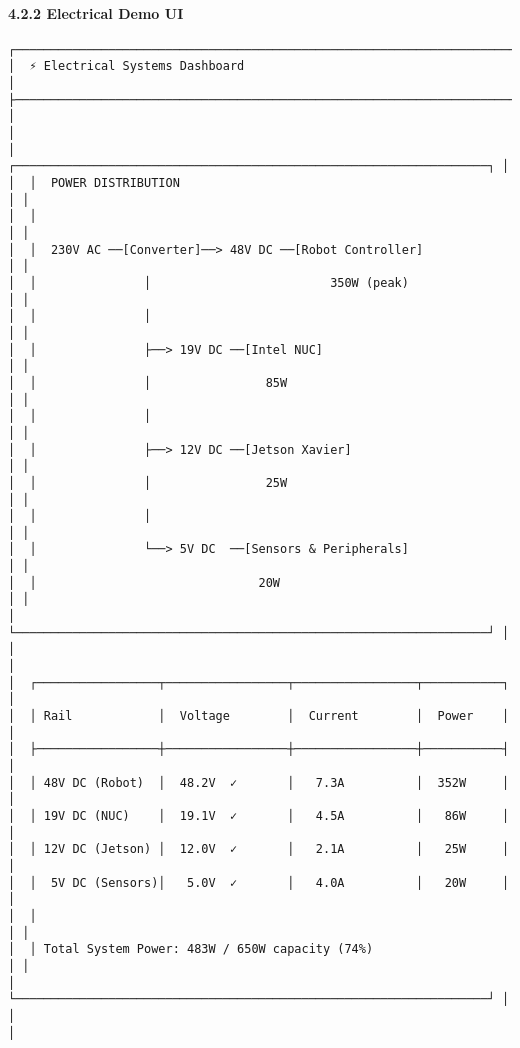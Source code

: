 \documentclass[
]{article}
\begin{document}
\hypertarget{electrical-demo-ui}{%
\paragraph{4.2.2 Electrical Demo UI}\label{electrical-demo-ui}}

\begin{verbatim}
┌────────────────────────────────────────────────────────────────────────┐
│  ⚡ Electrical Systems Dashboard                                       │
├────────────────────────────────────────────────────────────────────────┤
│                                                                        │
│  ┌──────────────────────────────────────────────────────────────────┐ │
│  │  POWER DISTRIBUTION                                              │ │
│  │                                                                   │ │
│  │  230V AC ──[Converter]──> 48V DC ──[Robot Controller]            │ │
│  │               │                         350W (peak)               │ │
│  │               │                                                   │ │
│  │               ├──> 19V DC ──[Intel NUC]                           │ │
│  │               │                85W                                │ │
│  │               │                                                   │ │
│  │               ├──> 12V DC ──[Jetson Xavier]                       │ │
│  │               │                25W                                │ │
│  │               │                                                   │ │
│  │               └──> 5V DC  ──[Sensors & Peripherals]               │ │
│  │                               20W                                 │ │
│  └──────────────────────────────────────────────────────────────────┘ │
│                                                                        │
│  ┌─────────────────┬─────────────────┬─────────────────┬───────────┐ │
│  │ Rail            │  Voltage        │  Current        │  Power    │ │
│  ├─────────────────┼─────────────────┼─────────────────┼───────────┤ │
│  │ 48V DC (Robot)  │  48.2V  ✓       │   7.3A          │  352W     │ │
│  │ 19V DC (NUC)    │  19.1V  ✓       │   4.5A          │   86W     │ │
│  │ 12V DC (Jetson) │  12.0V  ✓       │   2.1A          │   25W     │ │
│  │  5V DC (Sensors)│   5.0V  ✓       │   4.0A          │   20W     │ │
│  │                                                                  │ │
│  │ Total System Power: 483W / 650W capacity (74%)                   │ │
│  └──────────────────────────────────────────────────────────────────┘ │
│                                                                        │

\end{verbatim}
\end{document}
